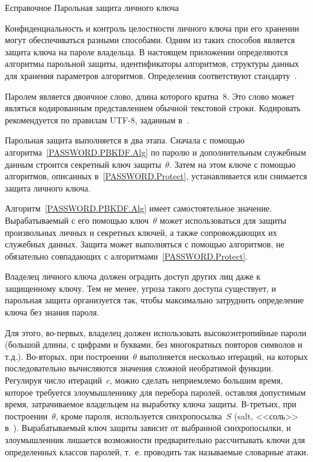 \begin{appendix}{Е}{справочное}
{Парольная защита личного ключа}
\label{PASSWORD}

\label{PASSWORD.Common}

Конфиденциальность и контроль целостности личного ключа при его
хранении могут обеспечиваться разными способами. 
Одним из таких способов является защита ключа на пароле владельца.
%
В настоящем приложении определяются алгоритмы парольной защиты, 
идентификаторы алгоритмов,
структуры данных для хранения параметров алгоритмов.
Определения соответствуют стандарту~\cite{PKCS5}. 

Паролем является двоичное слово, 
длина которого кратна~$8$. Это слово может являться
кодированным представлением обычной текстовой строки. 
Кодировать рекомендуется по правилам UTF-8, 
заданным в~\cite{UTF8}.

Парольная защита выполняется в два этапа. 
Сначала с помощью алгоритма~\ref{PASSWORD.PBKDF.Alg}
по паролю и дополнительным служебным данным 
строится секретный ключ защиты~$\theta$. 
Затем на этом ключе с помощью алгоритмов, 
описанных в~\ref{PASSWORD.Protect}, 
устанавливается или снимается защита личного ключа.

Алгоритм~\ref{PASSWORD.PBKDF.Alg} имеет самостоятельное значение.
Вырабатываемый с его помощью ключ~$\theta$ может использоваться
для защиты произвольных личных и секретных ключей,
а также сопровождающих их служебных данных.
Защита может выполняться с помощью алгоритмов, не обязательно совпадающих 
с алгоритмами~\ref{PASSWORD.Protect}. 

Владелец личного ключа должен оградить доступ других лиц
даже к защищенному ключу.
%
Тем не менее, угроза такого доступа существует, и парольная 
защита организуется так, чтобы максимально затруднить 
определение ключа без знания пароля.

Для этого, во-первых, владелец должен использовать высокоэнтропийные 
пароли (большой длины, с цифрами и буквами, 
без многократных повторов символов и т.д.).
%
Во-вторых, при построении~$\theta$ 
выполняется несколько итераций, на которых
последовательно вычисляются значения сложной необратимой функции.
%
Регулируя число итераций~$c$, можно сделать неприемлемо большим время, 
которое требуется злоумышленнику для перебора паролей,
оставляя допустимым время, затрачиваемое владельцем 
на выработку ключа защиты.
%
В-третьих, при построении~$\theta$, кроме пароля,
используется синхропосылка~$S$ (salt, <<соль>> в~\cite{PKCS5}). 
Вырабатываемый ключ защиты зависит от выбранной синхропосылки, 
и злоумышленник лишается возможности предварительно 
рассчитывать ключи для определенных классов паролей,
т.~е. проводить так называемые словарные атаки.


\end{appendix}
